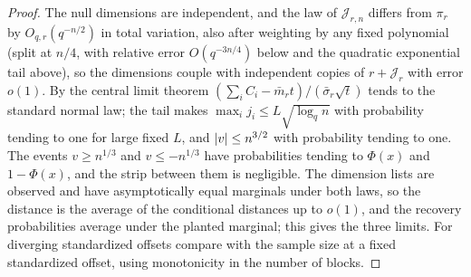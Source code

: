 \begin{proof}
The null dimensions are independent, and the law of $\mathcal J_{r,n}$ differs from $\pi_r$ by
$O_{q,r}(q^{-n/2})$ in total variation, also after weighting by any fixed polynomial (split at $n/4$, with
relative error $O(q^{-3n/4})$ below and the quadratic exponential tail above), so the dimensions couple with
independent copies of $r+\mathcal J_r$ with error $o(1)$. By the central limit theorem
$(\sum_iC_i-\bar m_rt)/(\bar\sigma_r\sqrt t)$ tends to the standard normal law; the tail makes
$\max_ij_i\le L\sqrt{\log_qn}$ with probability tending to one for large fixed $L$, and $\lvert v\rvert\le n^{3/2}$
with probability tending to one. The events $v\ge n^{1/3}$ and $v\le-n^{1/3}$ have probabilities tending to
$\Phi(x)$ and $1-\Phi(x)$, and the strip between them is negligible. The dimension lists are observed and
have asymptotically equal marginals under both laws, so the distance is the average of the conditional
distances up to $o(1)$, and the recovery probabilities average under the planted marginal; this gives the
three limits. For diverging standardized offsets compare with the sample size at a fixed standardized
offset, using monotonicity in the number of blocks.
\end{proof}

